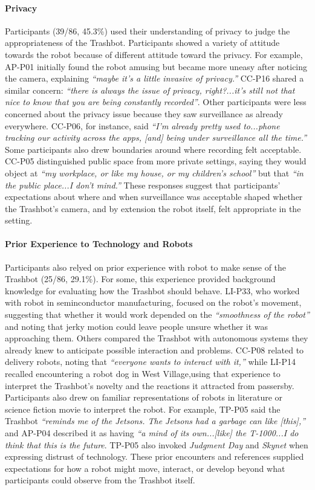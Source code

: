 \paragraph{Privacy}
Participants (39/86, 45.3\%) used their understanding of privacy to judge the appropriateness of the Trashbot. Participants showed a variety of attitude towards the robot because of different attitude toward the privacy. For example, AP-P01 initially found the robot amusing but became more uneasy after noticing the camera, explaining \emph{``maybe it's a little invasive of privacy.''} CC-P16 shared a similar concern: \emph{``there is always the issue of privacy, right?...it's still not that nice to know that you are being constantly recorded''}. Other participants were less concerned about the privacy issue because they saw surveillance as already everywhere. CC-P06, for instance, said \emph{``I'm already pretty used to...phone tracking our activity across the apps, [and] being under surveillance all the time.''} Some participants also drew boundaries around where recording felt acceptable. CC-P05 distinguished public space from more private settings, saying they would object at \emph{``my workplace, or like my house, or my children's school''} but that \emph{``in the public place...I don't mind.''} These responses suggest that participants’ expectations about where and when surveillance was acceptable shaped whether the Trashbot’s camera, and by extension the robot itself, felt appropriate in the setting.

\paragraph{Prior Experience to Technology and Robots}
Participants also relyed on prior experience with robot to make sense of the Trashbot (25/86, 29.1\%). For some, this experience provided background knowledge for evaluating how the Trashbot should behave. LI-P33, who worked with robot in seminconductor manufacturing, focused on the robot's movement, suggesting that whether it would work depended on the \emph{``smoothness of the robot''} and noting that jerky motion could leave people unsure whether it was approaching them. Others compared the Trashbot with autonomous systems they already knew to anticipate possible interaction and problems. CC-P08 related to delivery robots, noting that \emph{``everyone wants to interact with it,''} while LI-P14 recalled encountering a robot dog in West Village,using that experience to interpret the Trashbot's novelty and the reactions it attracted from passersby. Participants also drew on familiar representations of robots in literature or science fiction movie to interpret the robot. For example, TP-P05 said the Trashbot \emph{``reminds me of the Jetsons. The Jetsons had a garbage can like [this],''} and AP-P04 described it as having \emph{``a mind of its own...[like] the T-1000...I do think that this is the future}. TP-P05 also invoked \emph{Judgment Day} and \emph{Skynet} when expressing distrust of technology. These prior encounters and references supplied expectations for how a robot might move, interact, or develop beyond what participants could observe from the Trashbot itself.